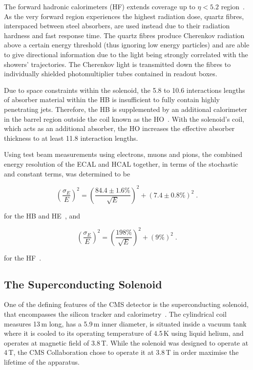The forward hadronic calorimeters (HF) extends coverage up to $\eta < 5.2$ region~\cite{HF}.
As the very forward region experiences the highest radiation dose, quartz fibres, interspaced between steel absorbers, are used instead due to their radiation hardness and fast response time.
The quartz fibres produce Cherenkov radiation above a certain energy threshold (thus ignoring low energy particles) and are able to give directional information due to the light being strongly correlated with the showers' trajectories.
The Cherenkov light is transmitted down the fibres to individually shielded photomultiplier tubes contained in readout boxes.

Due to space constraints within the solenoid, the 5.8 to 10.6 interactions lengths of absorber material within the HB is insufficient to fully contain highly penetrating jets.
Therefore, the HB is supplemented by an additional calorimeter in the barrel region outside the coil known as the HO~\cite{HO}.
With the solenoid's coil, which acts as an additional absorber, the HO increases the effective absorber thickness to at least 11.8 interaction lengths.

Using test beam measurements using electrons, muons and pions, the combined energy resolution of the ECAL and HCAL together, in terms of the stochastic and constant terms, was determined to be

\begin{equation}
(\frac{\sigma_{E}}{E})^{2} = (\frac{84.4 \pm 1.6\%}{\sqrt{E}})^{2} + (7.4 \pm 0.8\%)^{2} \;.
\label{eq:hcalResolution}
\end{equation}

for the HB and HE~\cite{Abdullin:2008zzb}, and

\begin{equation}
(\frac{\sigma_{E}}{E})^{2} = (\frac{198\%}{\sqrt{E}})^{2} + (9\%)^{2} \;.
\label{eq:hfResolution}
\end{equation}

for the HF~\cite{Bayatian:2006jz}.

\subsection{The Superconducting Solenoid}\label{subsec:magnet}
One of the defining features of the CMS detector is the superconducting solenoid, that encompasses the silicon tracker and calorimetry~\cite{Acquistapace:1997fm,Herve:2000}.
The cylindrical coil measures 13\,m long, has a 5.9\,m inner diameter, is situated inside a vacuum tank where it is cooled to its operating temperature of 4.5\,K using liquid helium, and operates at magnetic field of 3.8\,T.
While the solenoid was designed to operate at 4\,T, the CMS Collaboration chose to operate it at 3.8\,T in order maximise the lifetime of the apparatus.

